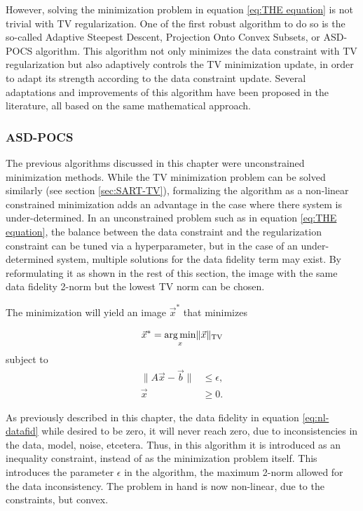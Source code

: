 However, solving the minimization problem in equation \ref{eq:THE equation} is not trivial with TV regularization. One of the first robust algorithm to do so is the so-called Adaptive Steepest Descent, Projection Onto Convex Subsets, or ASD-POCS algorithm\cite{ASD_POCS}. This algorithm not only minimizes the data constraint with TV regularization but also adaptively controls the TV minimization update, in order to adapt its strength according to the data constraint update. Several adaptations and improvements of this algorithm have been proposed in the literature\cite{liu2012adaptive}\cite{tian2011low}\cite{liu2013nonparametric}, all based on the same mathematical approach.  


\subsubsection{ASD-POCS}

The previous algorithms discussed in this chapter were unconstrained minimization methods. While the TV minimization problem can be solved similarly (see section \ref{sec:SART-TV}), formalizing the algorithm as a non-linear constrained minimization adds an advantage in the case where there system is under-determined. In an unconstrained problem such as in equation \ref{eq:THE equation}, the balance between the data constraint and the regularization constraint can be tuned via a hyperparameter, but in the case of an under-determined system, multiple solutions for the data fidelity term may exist. By reformulating it as shown in the rest of this section, the image with the same data fidelity 2-norm but the lowest TV norm can be chosen. 

The minimization will yield an image $\vec{x}^*$ that minimizes 

\begin{equation}
\vec{x}^*= \mathop{\mathrm{arg\,min}}_x \lVert \vec{x} \rVert_\text{TV}
\end{equation}
subject to 
\begin{align}
\lVert A \vec{x}-\vec{b}\rVert &\leq \epsilon,\label{eq:nl-datafid}\\
\vec{x}&\geq 0.
\end{align}

As previously described in this chapter, the data fidelity in equation \ref{eq:nl-datafid} while desired to be zero, it will never reach zero, due to inconsistencies in the data, model, noise, etcetera. Thus, in this algorithm it is introduced as an inequality constraint, instead of as the minimization problem itself. This introduces the parameter $\epsilon$ in the algorithm, the maximum 2-norm allowed for the data inconsistency. The problem in hand is now non-linear, due to the constraints, but convex.

